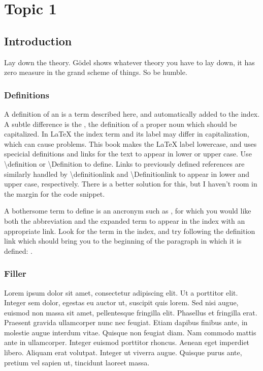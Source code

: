 \chapter{Topic 1}\label{chap:topic1}

\section{Introduction}\label{sec:topic1-introduction}
Lay down the theory. G{\"o}del shows whatever theory you have to lay down, it has zero measure in the grand scheme of things. So be humble.

\subsection{Definitions}\label{sec:topic1-introduction-definitions}
A definition of an  is a term described here, and automatically added to the index. A subtle difference is the , the definition of a proper noun which should be capitalized. In LaTeX the index term and its label may differ in capitalization, which can cause problems. This book makes the LaTeX label lowercase, and uses specicial definitions and links for the text to appear in lower or upper case. Use \textbackslash definition or \textbackslash Definition to define. Links to previously defined references are similarly handled by \textbackslash definitionlink and \textbackslash Definitionlink to appear in lower and upper case, respectively. There is a better solution for this, but I haven't room in the margin for the code snippet.

A bothersome term to define is an ancronym such as , for which you would like both the abbreviation and the expanded term to appear in the index with an appropriate link. Look for the term in the index, and try following the definition link which should bring you to the beginning of the paragraph in which it is defined: .

\subsection{Filler}\label{sec:topic1-introduction-filler}
Lorem ipsum dolor sit amet, consectetur adipiscing elit. Ut a porttitor elit. Integer sem dolor, egestas eu auctor ut, suscipit quis lorem. Sed nisi augue, euismod non massa sit amet, pellentesque fringilla elit. Phasellus et fringilla erat. Praesent gravida ullamcorper nunc nec feugiat. Etiam dapibus finibus ante, in molestie augue interdum vitae. Quisque non feugiat diam. Nam commodo mattis ante in ullamcorper. Integer euismod porttitor rhoncus. Aenean eget imperdiet libero. Aliquam erat volutpat. Integer ut viverra augue. Quisque purus ante, pretium vel sapien ut, tincidunt laoreet massa.

